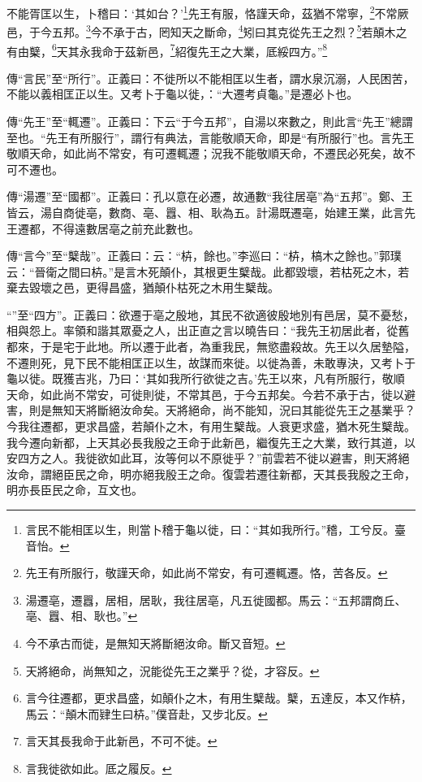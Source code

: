 不能胥匡以生，卜稽曰：‘其如台？’\footnote{言民不能相匡以生，則當卜稽于龜以徙，曰：“其如我所行。”稽，工兮反。臺音怡。}先王有服，恪謹天命，茲猶不常寧，\footnote{先王有所服行，敬謹天命，如此尚不常安，有可遷輒遷。恪，苦各反。}不常厥邑，于今五邦。\footnote{湯遷亳，遷囂，居相，居耿，我往居亳，凡五徙國都。馬云：“五邦謂商丘、亳、囂、相、耿也。”}今不承于古，罔知天之斷命，\footnote{今不承古而徙，是無知天將斷絕汝命。斷又音短。}矧曰其克從先王之烈？\footnote{天將絕命，尚無知之，況能從先王之業乎？從，才容反。}若顛木之有由櫱，\footnote{言今往遷都，更求昌盛，如顛仆之木，有用生櫱哉。櫱，五達反，本又作枿，馬云：“顛木而肄生曰枿。”僕音赴，又步北反。}天其永我命于茲新邑，\footnote{言天其長我命于此新邑，不可不徙。}紹復先王之大業，厎綏四方。”\footnote{言我徙欲如此。厎之履反。}

{\noindent\zhuan{}\fzbyks 傳“言民”至“所行”。正義曰：不徙所以不能相匡以生者，謂水泉沉溺，人民困苦，不能以義相匡正以生。又考卜于龜以徙，：“大遷考貞龜。”是遷必卜也。 \par}

{\noindent\zhuan{}\fzbyks 傳“先王”至“輒遷”。正義曰：下云“于今五邦”，自湯以來數之，則此言“先王”總謂至也。“先王有所服行”，謂行有典法，言能敬順天命，即是“有所服行”也。言先王敬順天命，如此尚不常安，有可遷輒遷；況我不能敬順天命，不遷民必死矣，故不可不遷也。 \par}

{\noindent\zhuan{}\fzbyks 傳“湯遷”至“國都”。正義曰：孔以意在必遷，故通數“我往居亳”為“五邦”。鄭、王皆云，湯自商徙亳，數商、亳、囂、相、耿為五。計湯既遷亳，始建王業，此言先王遷都，不得遠數居亳之前充此數也。 \par}

{\noindent\zhuan{}\fzbyks 傳“言今”至“櫱哉”。正義曰：云：“枿，餘也。”李巡曰：“枿，槁木之餘也。”郭璞云：“晉衛之間曰枿。”是言木死顛仆，其根更生櫱哉。此都毀壞，若枯死之木，若棄去毀壞之邑，更得昌盛，猶顛仆枯死之木用生櫱哉。 \par}

{\noindent\shu{}\fzkt “”至“四方”。正義曰：欲遷于亳之殷地，其民不欲適彼殷地別有邑居，莫不憂愁，相與怨上。率領和諧其眾憂之人，出正直之言以曉告曰：“我先王初居此者，從舊都來，于是宅于此地。所以遷于此者，為重我民，無慾盡殺故。先王以久居墊隘，不遷則死，見下民不能相匡正以生，故謀而來徙。以徙為善，未敢專決，又考卜于龜以徙。既獲吉兆，乃曰：‘其如我所行欲徙之吉。’先王以來，凡有所服行，敬順天命，如此尚不常安，可徙則徙，不常其邑，于今五邦矣。今若不承于古，徙以避害，則是無知天將斷絕汝命矣。天將絕命，尚不能知，況曰其能從先王之基業乎？今我往遷都，更求昌盛，若顛仆之木，有用生櫱哉。人衰更求盛，猶木死生櫱哉。我今遷向新都，上天其必長我殷之王命于此新邑，繼復先王之大業，致行其道，以安四方之人。我徙欲如此耳，汝等何以不原徙乎？”前雲若不徙以避害，則天將絕汝命，謂絕臣民之命，明亦絕我殷王之命。復雲若遷往新都，天其長我殷之王命，明亦長臣民之命，互文也。 \par}

